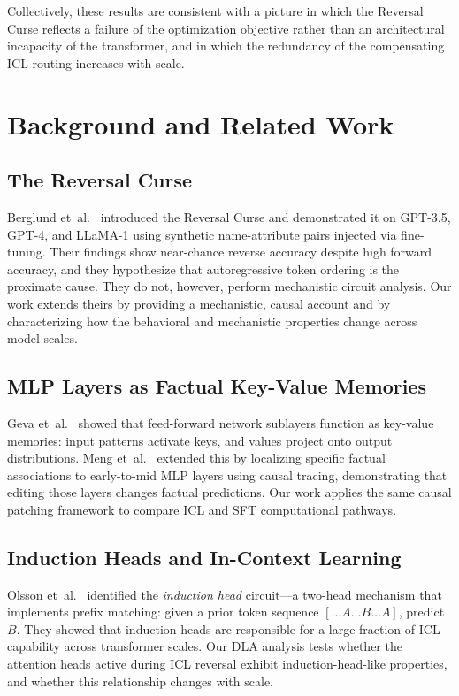 \documentclass[11pt]{article}
\begin{document}
Collectively, these results are consistent with a picture in which the Reversal
Curse reflects a failure of the optimization objective rather than an
architectural incapacity of the transformer, and in which the redundancy of
the compensating ICL routing increases with scale.

\section{Background and Related Work}

\subsection{The Reversal Curse}

Berglund et~al.~\cite{berglund2023reversal} introduced the Reversal Curse and
demonstrated it on GPT-3.5, GPT-4, and LLaMA-1 using synthetic name-attribute
pairs injected via fine-tuning. Their findings show near-chance reverse accuracy
despite high forward accuracy, and they hypothesize that autoregressive token
ordering is the proximate cause. They do not, however, perform mechanistic
circuit analysis. Our work extends theirs by providing a mechanistic, causal
account and by characterizing how the behavioral and mechanistic properties
change across model scales.

\subsection{MLP Layers as Factual Key-Value Memories}

Geva et~al.~\cite{geva2021transformer} showed that feed-forward network sublayers
function as key-value memories: input patterns activate keys, and values project
onto output distributions. Meng et~al.~\cite{meng2022locating} extended this by
localizing specific factual associations to early-to-mid MLP layers using causal
tracing, demonstrating that editing those layers changes factual predictions. Our
work applies the same causal patching framework to compare ICL and SFT
computational pathways.

\subsection{Induction Heads and In-Context Learning}

Olsson et~al.~\cite{olsson2022induction} identified the \emph{induction head}
circuit---a two-head mechanism that implements prefix matching: given a prior
token sequence $[\ldots A \ldots B \ldots A]$, predict $B$. They showed that
induction heads are responsible for a large fraction of ICL capability across
transformer scales. Our DLA analysis tests whether the attention heads active
during ICL reversal exhibit induction-head-like properties, and whether this
relationship changes with scale.
\end{document}
